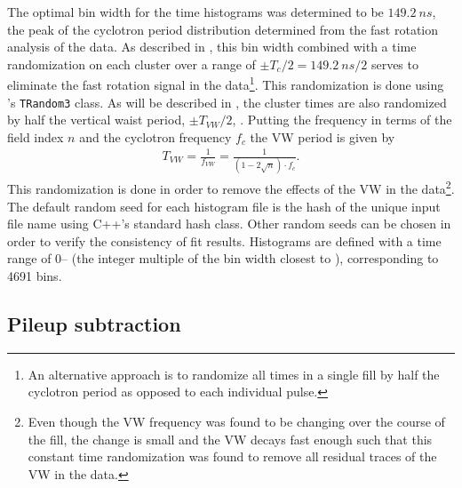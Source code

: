 The optimal bin width for the time histograms was determined to be $\SI{149.2}{ns}$, the peak of the cyclotron period distribution determined from the fast rotation analysis of the data. As described in , this bin width combined with a time randomization on each cluster over a range of $\pm T_{c}/2 = \SI{149.2}{ns} / 2$ serves to eliminate the fast rotation signal in the data\footnote{An alternative approach is to randomize all times in a single fill by half the cyclotron period as opposed to each individual pulse.}. This randomization is done using \ROOT's \texttt{TRandom3} class. As will be described in , the cluster times are also randomized by half the vertical waist period, $\pm T_{VW}/2$, . Putting the frequency in terms of the field index $n$ and the cyclotron frequency $f_{c}$ the VW period is given by
    \begin{align}
        T_{VW} = \frac{1}{f_{VW}} = \frac{1}{(1-2\sqrt{n}) \cdot f_{c}}.
    \end{align}
This randomization is done in order to remove the effects of the VW in the data\footnote{Even though the VW frequency was found to be changing over the course of the fill, the change is small and the VW decays fast enough such that this constant time randomization was found to remove all residual traces of the VW in the data.}. The default random seed for each histogram \ROOT file is the hash of the unique input file name using C++'s standard hash class. Other random seeds can be chosen in order to verify the consistency of fit results. Histograms are defined with a time range of 0-- (the integer multiple of the bin width closest to ), corresponding to 4691 bins. 




\subsection{Pileup subtraction}
\label{sub:pileupsubtraction}


